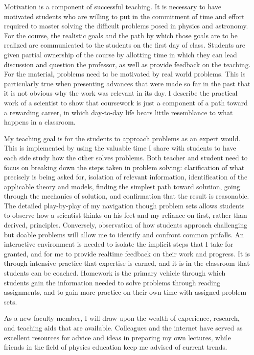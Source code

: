 \documentclass[12pt]{article}
\begin{document}
Motivation is a component of successful teaching.
It is necessary to have  motivated students who are willing to put in the commitment of time and effort
required to master solving the difficult problems posed in physics and astronomy.
For the course,
the realistic goals and the path by which those goals are to be realized
are communicated to the students on the first day of class.
Students are given partial ownership of the course by allotting time in which they can lead discussion and question the
professor, as well as provide feedback on the teaching.
For the material, problems need to be motivated by real world problems.
This is particularly true when presenting advances that were made so far in the past that it is not obvious
why the work was relevant in its day. 
I describe the practical work of a scientist to show that coursework
is just a component of a path toward a rewarding career, in which day-to-day life bears little resemblance to what
happens in a classroom.

My teaching goal is for the students to approach problems as an expert would.  This is implemented by using
the valuable time I share with students to have  each side study how the other
solves problems.  Both teacher and student need to focus on breaking down the steps taken in problem solving: 
clarification of what precisely is being asked for,
isolation of relevant information, 
identification of the applicable theory and models, finding the simplest path toward solution,
going through the mechanics of solution, and confirmation that the result is reasonable.
The detailed play-by-play of my navigation though problem sets  allows students to observe how a scientist thinks on his
feet and my reliance on first, rather than derived, principles.  Conversely, observation of how students
approach challenging but doable problems will allow me to identify and confront common pitfalls.
An interactive environment is needed to isolate the implicit  steps that I take for granted,
and for me to provide realtime feedback on their work and progress.
It is through intensive practice that expertise is earned, and it is in the classroom that students can be coached.
Homework is the primary vehicle through which students gain the information needed to solve problems
through reading assignments, and to gain more practice on their own time with assigned problem sets.

As a new faculty member, I will draw upon the wealth of experience, research, and teaching aids that are
available.
Colleagues and the internet have served as excellent resources for advice and ideas in preparing
my own lectures, while friends in the field of physics education keep me advised of current trends. 
 \iftoggle{UW}{The expertise at the University of Washington Institute for Science \& Mathematics Education
 looks like an excellent resource that I will take advantage of.}{I will avail
 myself to the resources for faculty at the Center
 for Research on Learning and Teaching.}
\end{document}
